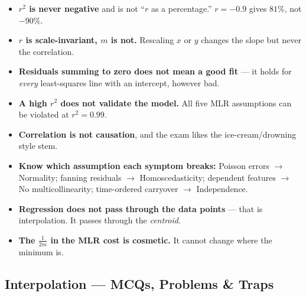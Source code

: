 \begin{trapbox}
\begin{itemize}
\item \textbf{$r^2$ is never negative} and is not ``$r$ as a percentage.'' $r = -0.9$ gives $81\%$, not $-90\%$.
\item \textbf{$r$ is scale-invariant, $m$ is not.} Rescaling $x$ or $y$ changes the slope but never the correlation.
\item \textbf{Residuals summing to zero does not mean a good fit} --- it holds for \emph{every} least-squares line with an intercept, however bad.
\item \textbf{A high $r^2$ does not validate the model.} All five MLR assumptions can be violated at $r^2 = 0.99$.
\item \textbf{Correlation is not causation}, and the exam likes the ice-cream/drowning style stem.
\item \textbf{Know which assumption each symptom breaks:} Poisson errors $\to$ Normality; fanning residuals $\to$ Homoscedasticity; dependent features $\to$ No multicollinearity; time-ordered carryover $\to$ Independence.
\item \textbf{Regression does not pass through the data points} --- that is interpolation. It passes through the \emph{centroid}.
\item \textbf{The $\frac{1}{2m}$ in the MLR cost is cosmetic.} It cannot change where the minimum is.
\end{itemize}
\end{trapbox}

\subsection{Interpolation --- MCQs, Problems \& Traps}

